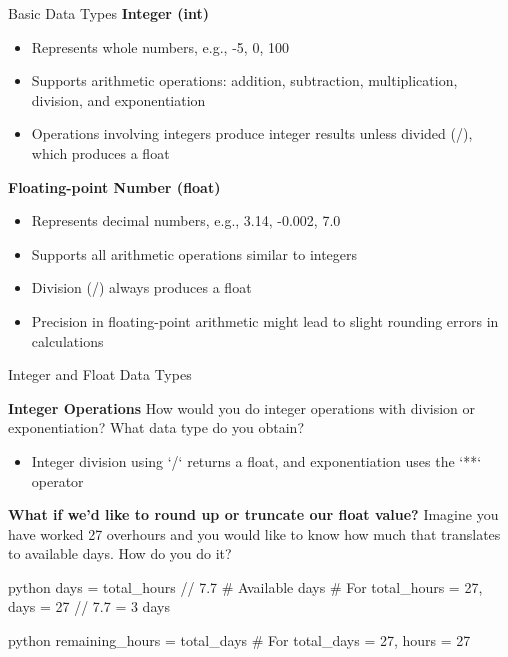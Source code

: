 \documentclass[
	11pt, 
]{beamer}
\begin{document}

\begin{frame}{Basic Data Types}
\textbf{Integer (int)}

    \begin{itemize}
            \item Represents whole numbers, e.g., -5, 0, 100
            \item Supports arithmetic operations: addition, subtraction, multiplication, division, and exponentiation
            \item Operations involving integers produce integer results unless divided (/), which produces a float
    \end{itemize} \bigskip

\textbf{Floating-point Number (float)}

    \begin{itemize}
            \item Represents decimal numbers, e.g., 3.14, -0.002, 7.0
            \item Supports all arithmetic operations similar to integers
            \item Division (/) always produces a float
            \item Precision in floating-point arithmetic might lead to slight rounding errors in calculations
    \end{itemize}
    
\end{frame}

\begin{frame}[fragile]{Integer and Float Data Types}


\begin{block}{\textbf{Integer Operations}}
How would you do integer operations with division or exponentiation? What data type do you obtain?
\end{block}

\pause
\begin{itemize}
    \item Integer division using `/` returns a float, and exponentiation uses the `**` operator
\end{itemize}
\pause

\begin{block}{\textbf{What if we'd like to round up or truncate our float value?}}
Imagine you have worked 27 overhours and you would like to know how much that translates to available days. How do you do it?
\end{block}
\pause



\begin{mintedbox}{python}
days = total_hours // 7.7  # Available days
# For total_hours = 27, days = 27 // 7.7 = 3 days
\end{mintedbox}
\begin{mintedbox}{python}
remaining_hours = total_days %
# For total_days = 27, hours = 27 %
\end{mintedbox}

\end{frame}
\end{document}
